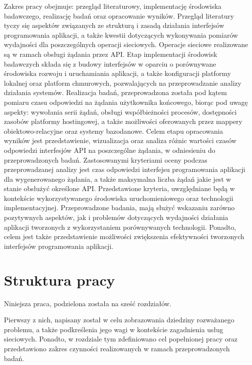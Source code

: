 Zakres pracy obejmuje: przegląd literaturowy, implementację środowiska badawczego, realizację badań oraz opracowanie wyników. Przegląd literatury tyczy się aspektów związanych ze strukturą i zasadą działania interfejsów programowania aplikacji, a także kwestii dotyczących wykonywania pomiarów wydajności dla poszczególnych operacji sieciowych. Operacje sieciowe realizowane są w ramach obsługi żądania przez API. Etap implementacji środowisk badawczych składa się z budowy interfejsów w oparciu o porównywane środowiska rozwoju i uruchamiania aplikacji, a także konfiguracji platformy lokalnej oraz platform chmurowych, pozwalających na przeprowadzanie analizy działania systemów. Realizacja badań, przeprowadzona została pod kątem pomiaru czasu odpowiedzi na żądania użytkownika końcowego, biorąc pod uwagę aspekty: wywołania serii żądań, obsługi współbieżności procesów, dostępności zasobów platformy hostingowej, a także możliwości oferowanych przez mappery obiektowo-relacyjne oraz systemy bazodanowe. Celem etapu opracowania wyników jest przedstawienie, wizualizacja oraz analiza różnic wartości czasów odpowiedzi interfesjów API na poszczególne żądania, w odniesieniu do przeprowadzonych badań. Zastosowanymi kryteriami oceny podczas przeprowadzanej analizy jest czas odpowiedzi interfejsu programowania aplikacji dla wygenerowanego żądania, a także maksymalna liczba żądań jakie jest w stanie obsłużyć określone API. Przedstawione kryteria, uwzględniane będą w kontekście wykorzystywanego środowiska uruchomieniowego oraz technologii implementacyjnej. Przeprowadzone badania, mają służyć wskazaniu zarówno pozytywnych aspektów, jak i problemów dotyczących wydajności działania aplikacji tworzonych z wykorzystaniem porównywanych technologii. Ponadto, celem jest także przedstawienie możliwości zwiększenia efektywności tworzonych interfejsów programowania aplikacji.
\section{Struktura pracy}
Niniejsza praca, podzielona została na sześć rozdziałów.

Pierwszy z nich, napisany został w celu zobrazowania dziedziny rozważanego problemu, a także podkreślenia jego wagi w kontekście zagadnienia usług sieciowych. Ponadto, w rozdziale tym zdefiniowano cel popełnionej pracy oraz przedstawiono zakres czynności realizowanych w ramach przeprowadzonych badań.

